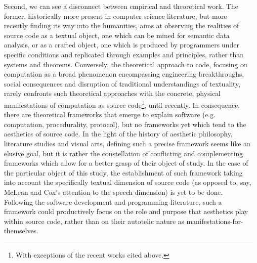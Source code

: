 Second, we can see a disconnect between empirical and theoretical work. The former, historically more present in computer science literature, but more recently finding its way into the humanities, aims at observing the realities of source code as a textual object, one which can be mined for semantic data analysis, or as a crafted object, one which is produced by programmers under specific conditions and replicated through examples and principles, rather than systems and theorems. Conversely, the theoretical approach to code, focusing on computation as a broad phenomenon encompassing engineering breakthroughs, social consequences and disruption of traditional understandings of textuality, rarely confronts such theoretical approaches with the concrete, physical manifestations of computation as source code\footnote{With exceptions of the recent works cited above.}, until recently.
In consequence, there are theoretical frameworks that emerge to explain software (e.g. computation, procedurality, protocol), but no frameworks yet which tend to the aesthetics of source code. In the light of the history of aesthetic philosophy, literature studies and visual arts, defining such a precise framework seems like an elusive goal, but it is rather the constellation of conflicting and complementing frameworks which allow for a better grasp of their object of study. In the case of the particular object of this study, the establishment of such framework taking into account the specifically textual dimension of source code (as opposed to, say, McLean and Cox's attention to the speech dimension) is yet to be done. Following the software development and programming literature, such a framework could productively focus on the role and purpose that aesthetics play within source code, rather than on their autotelic nature as manifestations-for-themselves.

